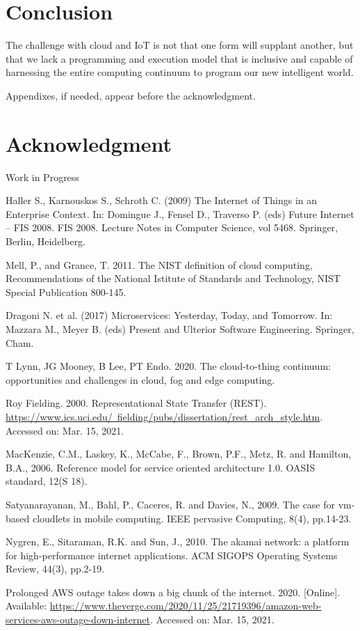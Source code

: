 \documentclass{ieeeaccess}
\begin{document}
\section{Conclusion}

The challenge with cloud and IoT is not that one form will supplant another, but that we lack a programming and execution model that is inclusive and capable of harnessing the entire computing continuum to program our new intelligent world.

\appendices

Appendixes, if needed, appear before the acknowledgment.

\section*{Acknowledgment}

Work in Progress

\begin{thebibliography}{00}

 Haller S., Karnouskos S., Schroth C. (2009) The Internet of Things in an Enterprise Context. In: Domingue J., Fensel D., Traverso P. (eds) Future Internet – FIS 2008. FIS 2008. Lecture Notes in Computer Science, vol 5468. Springer, Berlin, Heidelberg.

 Mell, P., and Grance, T. 2011. The NIST definition of cloud computing, Recommendations of the National Istitute of Standards and Technology, NIST Special Publication 800-145.

 Dragoni N. et al. (2017) Microservices: Yesterday, Today, and Tomorrow. In: Mazzara M., Meyer B. (eds) Present and Ulterior Software Engineering. Springer, Cham.

 T Lynn, JG Mooney, B Lee, PT Endo. 2020. The cloud-to-thing continuum: opportunities and challenges in cloud, fog and edge computing.

 Roy Fielding. 2000. Representational State Transfer (REST). \underline{https://www.ics.uci.edu/~fielding/pubs/dissertation/rest\_arch\_style.htm}. Accessed on: Mar. 15, 2021.

 MacKenzie, C.M., Laskey, K., McCabe, F., Brown, P.F., Metz, R. and Hamilton, B.A., 2006. Reference model for service oriented architecture 1.0. OASIS standard, 12(S 18).

 Satyanarayanan, M., Bahl, P., Caceres, R. and Davies, N., 2009. The case for vm-based cloudlets in mobile computing. IEEE pervasive Computing, 8(4), pp.14-23.

 Nygren, E., Sitaraman, R.K. and Sun, J., 2010. The akamai network: a platform for high-performance internet applications. ACM SIGOPS Operating Systems Review, 44(3), pp.2-19.

 Prolonged AWS outage takes down a big chunk of the internet. 2020. [Online]. Available: \underline{https://www.theverge.com/2020/11/25/21719396/amazon-web-services-aws-outage-down-internet}. Accessed on: Mar. 15, 2021.

\end{thebibliography}

\EOD
\end{document}
